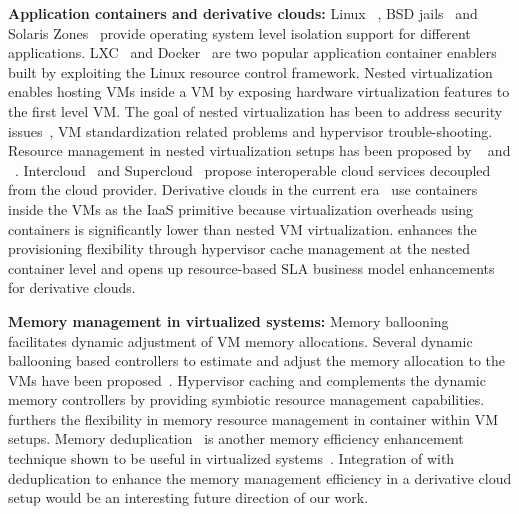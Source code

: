 \noindent
{\bf Application containers and derivative clouds:} Linux \cgroups~\cite{cgroup},
BSD jails~\cite{jail} and Solaris Zones~\cite{zone} provide operating system 
level isolation support for different applications.
%  
LXC~\cite{lxc} and Docker~\cite{docker} are two popular application container
enablers built by exploiting the Linux \cgroup{} resource control framework.
%
Nested virtualization~\cite{turtle,blanket,recursv} enables hosting VMs inside a VM
by exposing hardware virtualization features to the first level VM.
%
The goal of nested virtualization has been to address security issues~\cite{vx32},
VM standardization related problems and hypervisor trouble-shooting. 
%
Resource management in nested virtualization setups has been proposed 
by ~\cite{intercloud} and ~\cite{supercloud}.
%
Intercloud~\cite{intercloud} and Supercloud~\cite{supercloud} propose 
interoperable 
cloud services 
decoupled from the cloud provider. 
%
Derivative clouds in the current era~\cite{spotcheck, heroku, picloud} use 
containers inside the VMs as the IaaS primitive because virtualization 
overheads using containers is significantly lower than 
nested VM virtualization.
%
\dd{} enhances the provisioning flexibility through hypervisor cache management
at the nested container level and opens up resource-based SLA
business model enhancements for 
derivative clouds.


\noindent
{\bf Memory management in virtualized systems:} Memory 
ballooning~\cite{vmware,hotplug} facilitates dynamic adjustment of VM memory  
allocations.
%
Several dynamic ballooning based controllers to estimate and adjust the memory 
allocation to the VMs have been proposed~\cite{wss, membal, tws}.
%
Hypervisor caching and \dd{} complements the dynamic memory controllers
by providing symbiotic resource management capabilities.
%
\dd{} furthers the flexibility in memory resource management in container 
within VM setups.
%
Memory deduplication~\cite{vmware,ksmpaper,satori} is another memory
efficiency enhancement technique shown to be useful in virtualized
systems~\cite{ksmpaper,utc}.   
%
Integration of \dd{} with deduplication to enhance the memory management
efficiency in a derivative cloud setup would be an interesting future
direction of our work.
%

